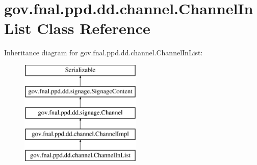 \hypertarget{classgov_1_1fnal_1_1ppd_1_1dd_1_1channel_1_1ChannelInList}{\section{gov.\-fnal.\-ppd.\-dd.\-channel.\-Channel\-In\-List Class Reference}
\label{classgov_1_1fnal_1_1ppd_1_1dd_1_1channel_1_1ChannelInList}
}
Inheritance diagram for gov.\-fnal.\-ppd.\-dd.\-channel.\-Channel\-In\-List\-:\begin{figure}[H]
\begin{center}
\leavevmode
\includegraphics[height=5.000000cm]{classgov_1_1fnal_1_1ppd_1_1dd_1_1channel_1_1ChannelInList}
\end{center}
\end{figure}
